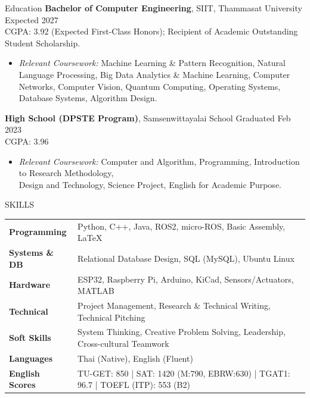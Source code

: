 \documentclass[11pt]{resume} %
\begin{document}
\vspace{-1mm} %
\begin{rSection}{Education}
    {\bf Bachelor of Computer Engineering}, SIIT, Thammasat University \hfill {Expected 2027} \\
    CGPA: 3.92 (Expected First-Class Honors); Recipient of Academic Outstanding Student Scholarship.
    \begin{itemize}[leftmargin=*, itemsep=-3pt, topsep=-5pt]
        \item \textit{Relevant Coursework:} Machine Learning \& Pattern Recognition, Natural Language Processing, Big Data Analytics \& Machine Learning, Computer Networks, Computer Vision, Quantum Computing, Operating Systems, Database Systems, Algorithm Design. %
    \end{itemize}
    \vspace{0.25em}

    {\bf High School (DPSTE Program)}, Samsenwittayalai School \hfill {Graduated Feb 2023} \\
    CGPA: 3.96
     \begin{itemize}[leftmargin=*, itemsep=-3pt, topsep=-5pt]
        \item \textit{Relevant Coursework:} Computer and Algorithm, Programming, Introduction to Research Methodology, \\Design and Technology, Science Project, English for Academic Purpose.
     \end{itemize}
\end{rSection}

\vspace{-1 mm}
\begin{rSection}{SKILLS}
\begin{tabular}{ @{} >{\bfseries}l @{\hspace{6ex}} l } %
Programming & Python, C++, Java, ROS2, micro-ROS, Basic Assembly, LaTeX \\
Systems \& DB & Relational Database Design, SQL (MySQL), Ubuntu Linux \\
Hardware & ESP32, Raspberry Pi, Arduino, KiCad, Sensors/Actuators, MATLAB \\
Technical & Project Management, Research \& Technical Writing, Technical Pitching \\
Soft Skills & System Thinking, Creative Problem Solving, Leadership, Cross-cultural Teamwork \\
Languages & Thai (Native), English (Fluent) \\
English Scores & TU-GET: 850 | SAT: 1420 (M:790, EBRW:630) | TGAT1: 96.7 | TOEFL (ITP): 553 (B2) %
\end{tabular}
\end{rSection}
\end{document}
